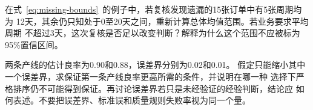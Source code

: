 \begin{exercise}[缺失范围与补充调查]
在式~\eqref{eq:missing-bounds}~的例子中，若复核发现遗漏的15张订单中有5张周期均为
12天，其余仍只知处于0至20天之间，重新计算总体均值范围。若业务要求平均周期
不超过3天，这次复核是否足以改变判断？解释为什么这个范围不应被标为95\%置信区间。
\end{exercise}

\begin{exercise}[把质量预算投向决策敏感位置]
两条产线的估计良率为0.90和0.88，误差界分别为0.02和0.01。
假定只能缩小其中一个误差界，求保证第一条产线良率更高所需的条件，并说明在哪一种
选择下严格排序仍不可能得到保证。再讨论误差界若只是未经验证的经验判断，结论应
如何表述。不要把误差界、标准误和质量规则失败率视为同一个量。
\end{exercise}
